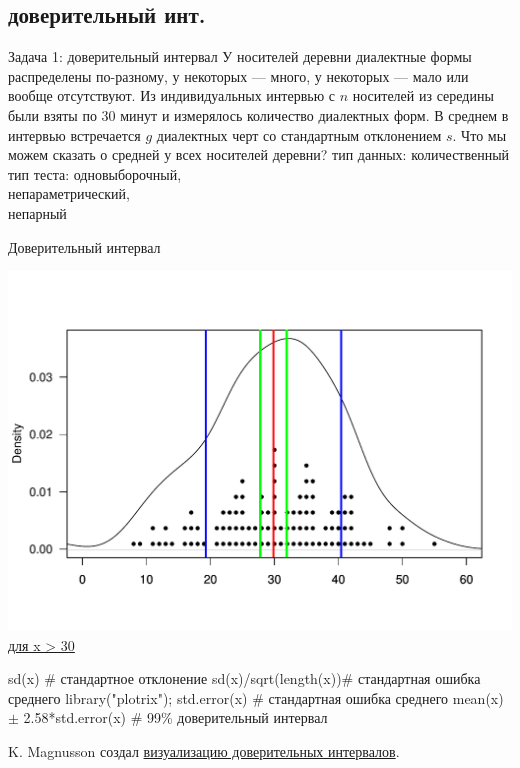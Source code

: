 \subsection{доверительный инт.}
\begin{frame}{Задача 1: доверительный интервал}
У носителей деревни диалектные формы распределены по-разному, у некоторых — много, у некоторых —  мало или вообще отсутствуют. Из индивидуальных интервью с $n$ носителей из середины были взяты по 30 минут и измерялось количество диалектных форм. В среднем в интервью встречается $g$ диалектных черт со стандартным отклонением $s$. Что мы можем сказать о средней у всех носителей деревни? \pause 
\vfill
тип данных: количественный\\
тип теста: одновыборочный,\\
непараметрический,\\
непарный
\end{frame}
\begin{frame}{Доверительный интервал}
\begin{center}
\vspace{-4mm}
\includegraphics[width=0.71\linewidth]{confint.pdf}
{\Large \hfill \underline{для x > 30}}
\end{center}
\begin{itemize}
\mytem {\color{red}{mean(x) \hfill \# среднее}}
\mytem \alert{sd(x) \hfill \# стандартное отклонение}
\mytem sd(x)/sqrt(length(x))\hfill \# стандартная ошибка среднего
\mytem library("plotrix"); std.error(x) \hfill \# стандартная ошибка среднего
\mytem {\color{green}{mean(x) $\pm$ 1.96*std.error(x) \hfill \# 95\% доверительный интервал}}
\mytem mean(x) $\pm$ 2.58*std.error(x) \hfill \# 99\% доверительный интервал
\end{itemize}
K. Magnusson создал \alert{\href{http://rpsychologist.com/d3/CI/}{визуализацию доверительных интервалов}}.
\bigskip
\end{frame}
